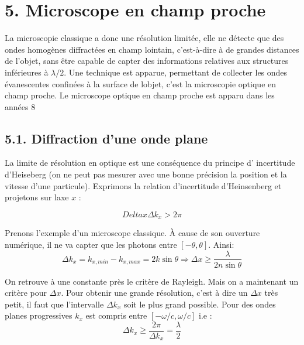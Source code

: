 \documentclass[french, a4paper, 10pt, twocolumn, landscape]{article}
\begin{document}
\section*{5. Microscope en champ proche}

La microscopie classique a donc une résolution limitée, elle ne détecte que des ondes homogènes diffractées en champ lointain, c'est-à-dire à de grandes distances de l'objet, sans être capable de capter des informations
relatives aux structures inférieures à $\lambda/2$. Une technique est apparue, permettant de collecter les ondes évanescentes confinées à la surface de lobjet,
c'est la microscopie optique en champ proche. Le microscope optique en champ proche est apparu dans les années 8


\subsection*{5.1. Diffraction d'une onde plane}

La limite de résolution en optique est une conséquence du principe d' incertitude d'Heiseberg (on ne peut pas mesurer avec une bonne précision la
position et la vitesse d'une particule).
Exprimons la relation d'incertitude d'Heinsenberg et projetons sur laxe
$x$ :

\begin{equation}
	Delta x \Delta k_x > 2\pi
\end{equation}
	
Prenons l'exemple d'un microscope classique. À cause de son ouverture numérique, il ne va capter que les photons entre $[-\theta,\theta]$. Ainsi: 
\begin{equation}
	\Delta k_x = k_{x, min} - k_{x, max} = 2k\sin\theta \Rightarrow \Delta x\geq \dfrac{\lambda}{2n\sin\theta}
\end{equation}

On retrouve à une constante près le critère de Rayleigh. Mais on a maintenant un critère pour $\Delta x$. Pour obtenir une grande résolution, c'est à dire un $\Delta x$ très petit, il faut que l'intervalle $\Delta k _x$ soit le plus grand possible. Pour des ondes planes progressives $k_x$ est compris entre $[-\omega/c, \omega/c]$ i.e :
\begin{equation}
	\Delta k_x\geq \dfrac{2\pi}{\Delta k_x}=\dfrac{\lambda}{2}
\end{equation}
\end{document}
